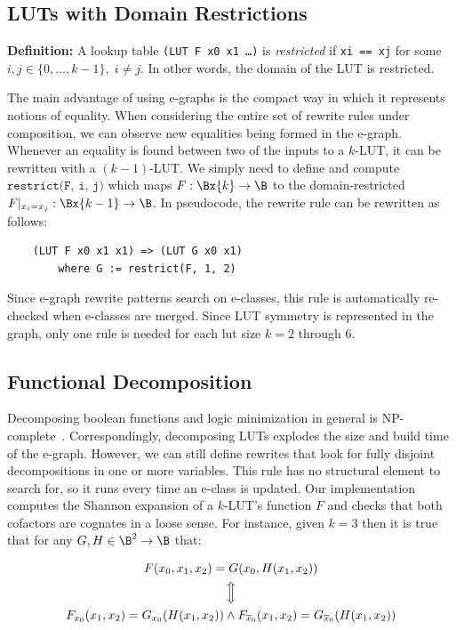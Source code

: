 \subsection{LUTs with Domain Restrictions}\label{sec:rewrites:restrict}

\textbf{Definition:} A lookup table \texttt{(LUT F x0 x1 \ldots)} is \textit{restricted} if \texttt{xi == xj} for some $ i, j \in \{0, \ldots, k-1\}, \; i \neq j$.
In other words, the domain of the LUT is restricted.

The main advantage of using e-graphs is the compact way in which it represents
notions of equality. When considering the entire set of rewrite rules under
composition, we can observe new equalities being formed in the e-graph.
Whenever an equality is found between two of the inputs to a $k$-LUT, it can be
rewritten with a $(k-1)$-LUT. We simply need to define and compute
$\texttt{restrict(F, i, j)}$ which maps $F : \Bx{k} \rightarrow \B$ to the
domain-restricted $F \vert_{x_i = x_j} : \Bx{k-1} \rightarrow \B$. In
pseudocode, the rewrite rule can be rewritten as follows:

\begin{verbatim}
    (LUT F x0 x1 x1) => (LUT G x0 x1)
        where G := restrict(F, 1, 2)
\end{verbatim}

Since e-graph rewrite patterns search on e-classes, this rule is automatically
re-checked when e-classes are merged. Since LUT symmetry is represented in the
graph, only one rule is needed for each lut size $k=2$ through 6.

\subsection{Functional Decomposition}\label{sec:rewrites:decomp}

Decomposing boolean functions and logic minimization in general is
NP-complete~\cite{logicmin}. Correspondingly, decomposing LUTs explodes the
size and build time of the e-graph. However, we can still define rewrites that
look for fully disjoint decompositions in one or more variables. This rule has
no structural element to search for, so it runs every time an e-class is
updated. Our implementation computes the Shannon expansion of a $k$-LUT's
function $F$ and checks that both cofactors are cognates in a loose sense. For
instance, given $k=3$ then it is true that for any $G, H \in \B^2 \rightarrow
    \B$ that:

\begin{gather}
    F(x_0, x_1, x_2) = G(x_0, H(x_1, x_2)) \nonumber \\
    \Big\Updownarrow                       \nonumber \\
    F_{x_0} (x_1, x_2) = G_{x_0} (H(x_1, x_2)) \land F_{\overline{x}_0} (x_1, x_2) = G_{\overline{x}_0} (H(x_1, x_2))
\end{gather}

